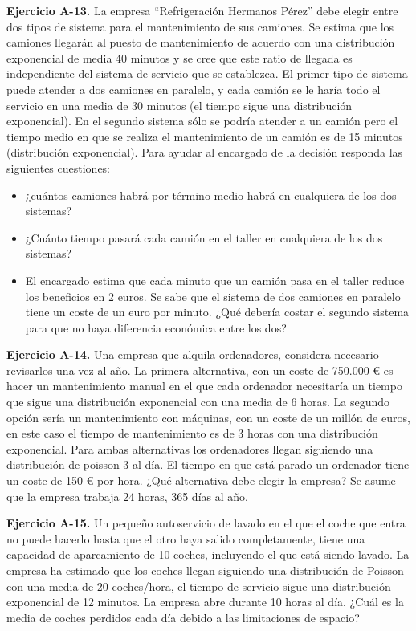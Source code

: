 \documentclass[
]{book}
\providecommand{\tightlist}{%
  \setlength{\itemsep}{0pt}\setlength{\parskip}{0pt}}
\theoremstyle{definition}
\theoremstyle{definition}
\theoremstyle{definition}
\theoremstyle{definition}
\theoremstyle{remark}
\begin{document}
\textbf{Ejercicio A-13.} La empresa ``Refrigeración Hermanos Pérez'' debe elegir entre dos tipos de sistema para el mantenimiento de sus camiones. Se estima que los camiones llegarán al puesto de mantenimiento de acuerdo con una distribución exponencial de media 40 minutos y se cree que este ratio de llegada es independiente del sistema de servicio que se establezca. El primer tipo de sistema puede atender a dos camiones en paralelo, y cada camión se le haría todo el servicio en una media de 30 minutos (el tiempo sigue una distribución exponencial). En el segundo sistema sólo se podría atender a un camión pero el tiempo medio en que se realiza el mantenimiento de un camión es de 15 minutos (distribución exponencial). Para ayudar al encargado de la decisión responda las siguientes cuestiones:

\begin{itemize}
\tightlist
\item
  ¿cuántos camiones habrá por término medio habrá en cualquiera de los dos sistemas?
\item
  ¿Cuánto tiempo pasará cada camión en el taller en cualquiera de los dos sistemas?
\item
  El encargado estima que cada minuto que un camión pasa en el taller reduce los beneficios en 2 euros. Se sabe que el sistema de dos camiones en paralelo tiene un coste de un euro por minuto. ¿Qué debería costar el segundo sistema para que no haya diferencia económica entre los dos?
\end{itemize}

\textbf{Ejercicio A-14.} Una empresa que alquila ordenadores, considera necesario revisarlos una vez al año. La primera alternativa, con un coste de 750.000 € es hacer un mantenimiento manual en el que cada ordenador necesitaría un tiempo que sigue una distribución exponencial con una media de 6 horas. La segundo opción sería un mantenimiento con máquinas, con un coste de un millón de euros, en este caso el tiempo de mantenimiento es de 3 horas con una distribución exponencial. Para ambas alternativas los ordenadores llegan siguiendo una distribución de poisson 3 al día. El tiempo en que está parado un ordenador tiene un coste de 150 € por hora. ¿Qué alternativa debe elegir la empresa? Se asume que la empresa trabaja 24 horas, 365 días al año.

\textbf{Ejercicio A-15.} Un pequeño autoservicio de lavado en el que el coche que entra no puede hacerlo hasta que el otro haya salido completamente, tiene una capacidad de aparcamiento de 10 coches, incluyendo el que está siendo lavado. La empresa ha estimado que los coches llegan siguiendo una distribución de Poisson con una media de 20 coches/hora, el tiempo de servicio sigue una distribución exponencial de 12 minutos. La empresa abre durante 10 horas al día. ¿Cuál es la media de coches perdidos cada día debido a las limitaciones de espacio?
\end{document}
